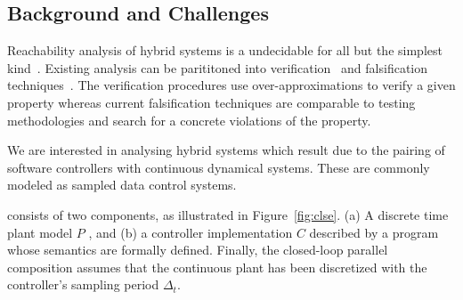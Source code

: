 






\subsection{Background and Challenges}

Reachability analysis of hybrid systems is a undecidable for all but
the simplest kind~\cite{henzinger1995s}. Existing analysis can be
parititoned into verification~\cite{tiwari2012hybridsal,
Chen2012taylor, Frehse+Others/2011/SpaceEx, althoff2016combining,
duggirala2015c2e2} and falsification techniques~\cite{annpureddy2011s,
donze2010breach, dreossi2015efficient}. The verification procedures
use over-approximations to verify a given property whereas current
falsification techniques are comparable to testing methodologies and
search for a concrete violations of the property.

We are interested in analysing hybrid systems which result due to the
pairing of software controllers with continuous dynamical systems.
These are commonly modeled as sampled data control systems.


 consists of two
components, as illustrated in Figure~\ref{fig:clse}. (a) A discrete
time plant model $P$ , and (b) a controller implementation $C$
described by a program whose semantics are formally defined.  Finally,
the closed-loop parallel composition assumes that the continuous plant
has been discretized with the controller's sampling period $\Delta_t$.

